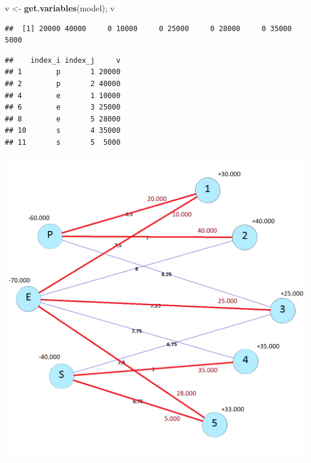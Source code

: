 \documentclass[]{article}
\newenvironment{Shaded}{\begin{snugshade}}{\end{snugshade}}
\newcommand{\KeywordTok}[1]{\textcolor[rgb]{0.13,0.29,0.53}{\textbf{#1}}}
\newcommand{\NormalTok}[1]{#1}
\newcommand{\OperatorTok}[1]{\textcolor[rgb]{0.81,0.36,0.00}{\textbf{#1}}}
\newcommand{\StringTok}[1]{\textcolor[rgb]{0.31,0.60,0.02}{#1}}
\begin{document}
\begin{Shaded}
\begin{Highlighting}[]
\NormalTok{v <-}\StringTok{ }\KeywordTok{get.variables}\NormalTok{(model); v}
\end{Highlighting}
\end{Shaded}

\begin{verbatim}
##  [1] 20000 40000     0 10000     0 25000     0 28000     0 35000  5000
\end{verbatim}

\begin{Shaded}
\end{Shaded}

\begin{verbatim}
##    index_i index_j     v
## 1        p       1 20000
## 2        p       2 40000
## 4        e       1 10000
## 6        e       3 25000
## 8        e       5 28000
## 10       s       4 35000
## 11       s       5  5000
\end{verbatim}

\includegraphics{graph-solved.png}
\end{document}
